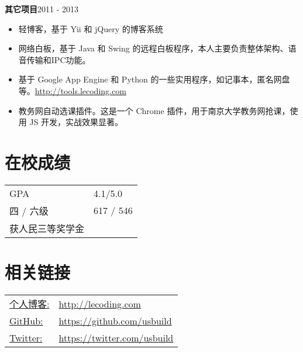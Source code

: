 \documentclass[margin]{res}
\begin{document}
\begin{resume}
{\bf 其它项目}\hfill 2011 - 2013
\begin{itemize} \itemsep -2pt
\item 轻博客，基于 Yii 和 jQuery 的博客系统
\item 网络白板，基于 Java 和 Swing 的远程白板程序，本人主要负责整体架构、语音传输和IPC功能。
\item 基于 Google App Engine 和 Python 的一些实用程序，如记事本，匿名网盘等。\href{http://tools.lecoding.com}{http://tools.lecoding.com}
\item 教务网自动选课插件。这是一个 Chrome 插件，用于南京大学教务网抢课，使用 JS 开发，实战效果显著。
\end{itemize}

\section{在校成绩} 
   \begin{tabular}{l p{3in}}
      GPA &  4.1/5.0 \\
      四 / 六级 & 617 / 546 \\
      获人民三等奖学金
 \end{tabular}

\section{相关链接}
   \begin{tabular}{l p{3in}}
     \underline{个人博客:} & \href{http://lecoding.com}{http://lecoding.com}\\
     \underline{GitHub:} &  \href{https://github.com/usbuild}{https://github.com/usbuild}\\
     \underline{Twitter:} & \href{https://twitter.com/usbuild}{https://twitter.com/usbuild}
 \end{tabular}

\end{resume} 
\end{document}

